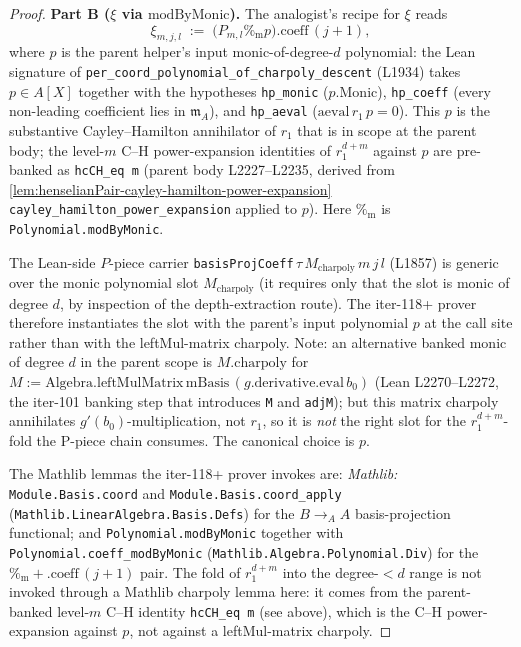 \begin{proof}
\textbf{Part B ($\xi$ via $\mathrm{modByMonic}$).} The
analogist's recipe for $\xi$ reads
\[
\xi_{m,j,l}
\;:=\;
\bigl(P_{m,l} \mathbin{\%_{\mathrm{m}}} p\bigr)
.\mathrm{coeff}\,(j + 1),
\]
where $p$ is the parent helper's input monic-of-degree-$d$
polynomial: the Lean signature of
\texttt{per\_coord\_polynomial\_of\_charpoly\_descent} (L1934)
takes $p \in A[X]$ together with the hypotheses
\texttt{hp\_monic} ($p.\mathrm{Monic}$), \texttt{hp\_coeff}
(every non-leading coefficient lies in $\mathfrak m_A$), and
\texttt{hp\_aeval} ($\mathrm{aeval}\,r_1\,p = 0$). This $p$ is
the substantive Cayley--Hamilton annihilator of $r_1$ that is
in scope at the parent body; the level-$m$ C--H power-expansion
identities of $r_1^{d + m}$ against $p$ are pre-banked as
\texttt{hcCH\_eq m} (parent body L2227--L2235, derived from
\cref{lem:henselianPair-cayley-hamilton-power-expansion}
\texttt{cayley\_hamilton\_power\_expansion} applied to $p$).
Here $\mathbin{\%_{\mathrm{m}}}$ is
\texttt{Polynomial.modByMonic}.

The Lean-side $P$-piece carrier
\texttt{basisProjCoeff}\,$\tau$\,$M_{\mathrm{charpoly}}$\,$m$\,$j$\,$l$
(L1857) is generic over the monic polynomial slot
$M_{\mathrm{charpoly}}$ (it requires only that the slot is monic
of degree $d$, by inspection of the depth-extraction route).
The iter-118+ prover therefore instantiates the slot with the
parent's input polynomial $p$ at the call site rather than with
the leftMul-matrix charpoly. Note: an alternative banked monic of
degree $d$ in the parent scope is
$M.\mathrm{charpoly}$ for $M := \mathrm{Algebra.leftMulMatrix}\,
\mathrm{mBasis}\,(g.\mathrm{derivative.eval}\,b_0)$ (Lean
L2270--L2272, the iter-101 banking step that introduces
\texttt{M} and \texttt{adjM}); but this matrix charpoly
annihilates $g'(b_0)$-multiplication, not $r_1$, so it is
\emph{not} the right slot for the $r_1^{d + m}$-fold the P-piece
chain consumes. The canonical choice is $p$.

The Mathlib lemmas the iter-118+ prover invokes are:
\textit{Mathlib:} \texttt{Module.Basis.coord} and
\texttt{Module.Basis.coord\_apply}
(\texttt{Mathlib.LinearAlgebra.Basis.Defs}) for the
$B \to_A A$ basis-projection functional; and
\texttt{Polynomial.modByMonic} together with
\texttt{Polynomial.coeff\_modByMonic}
(\texttt{Mathlib.Algebra.Polynomial.Div}) for the
$\mathbin{\%_{\mathrm{m}}} + .\mathrm{coeff}\,(j+1)$ pair. The
fold of $r_1^{d + m}$ into the degree-$< d$ range is not invoked
through a Mathlib charpoly lemma here: it comes from the
parent-banked level-$m$ C--H identity \texttt{hcCH\_eq m} (see
above), which is the C--H power-expansion against $p$, not
against a leftMul-matrix charpoly.


\end{proof}
